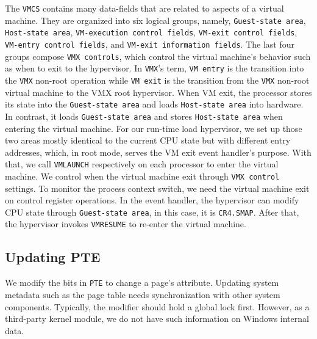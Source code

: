 The \texttt{VMCS} contains many data-fields that are related to aspects of a virtual machine. They are organized into six logical groups, namely, \texttt{Guest-state area}, \texttt{Host-state area}, \texttt{VM-execution control fields}, \texttt{VM-exit control fields}, \texttt{VM-entry control fields}, and \texttt{VM-exit information fields}. The last four groups compose \texttt{VMX controls}, which control the virtual machine's behavior such as when to exit to the hypervisor. In \texttt{VMX}'s term, \texttt{VM entry} is the transition into the \texttt{VMX} non-root operation while \texttt{VM exit} is the transition from the \texttt{VMX} non-root virtual machine to the VMX root  hypervisor. When VM exit, the processor stores its state into the \texttt{Guest-state area} and loads \texttt{Host-state area} into hardware. In contrast, it loads \texttt{Guest-state area} and stores \texttt{Host-state area} when entering the virtual machine. For our run-time load hypervisor, we set up those two areas mostly identical to the current CPU state but with different entry addresses, which, in root mode, serves the VM exit event handler's purpose. With that, we call \texttt{VMLAUNCH} respectively on each processor to enter the virtual machine. We control when the virtual machine exit through \texttt{VMX control} settings. To monitor the process context switch, we need the virtual machine exit on control register operations. In the event handler, the hypervisor can modify CPU state through \texttt{Guest-state area}, in this case, it is \texttt{CR4.SMAP}. After that, the hypervisor invokes \texttt{VMRESUME} to re-enter the virtual machine.

\subsection{Updating PTE}

We modify the bits in \texttt{PTE} to change a page's attribute. Updating system metadata such as the page table needs synchronization with other system components. Typically, the modifier should hold a global lock first. However, as a third-party kernel module, we do not have such information on Windows internal data.


%

